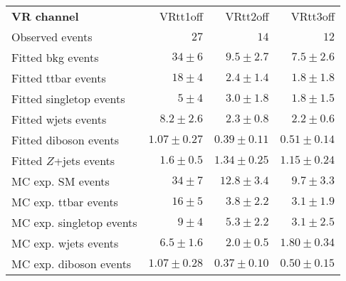 

\begin{table}
\begin{center}
\setlength{\tabcolsep}{0.0pc}
{\small
\begin{tabular*}{\textwidth}{@{\extracolsep{\fill}}lrrr}
\noalign{\smallskip}\hline\noalign{\smallskip}
{\textbf{ VR channel}}           & VRtt1off            & VRtt2off            & VRtt3off              \\[-0.05cm]
\noalign{\smallskip}\hline\noalign{\smallskip}
Observed events          & $27$              & $14$              & $12$                    \\
\noalign{\smallskip}\hline\noalign{\smallskip}
Fitted bkg events         & $34 \pm 6$          & $9.5 \pm 2.7$          & $7.5 \pm 2.6$              \\
\noalign{\smallskip}\hline\noalign{\smallskip}
        Fitted ttbar events         & $18 \pm 4$          & $2.4 \pm 1.4$          & $1.8 \pm 1.8$              \\
        Fitted singletop events         & $5 \pm 4$          & $3.0 \pm 1.8$          & $1.8 \pm 1.5$              \\
        Fitted wjets events         & $8.2 \pm 2.6$          & $2.3 \pm 0.8$          & $2.2 \pm 0.6$              \\
        Fitted diboson events         & $1.07 \pm 0.27$          & $0.39 \pm 0.11$          & $0.51 \pm 0.14$              \\
        Fitted $Z$+jets events         & $1.6 \pm 0.5$          & $1.34 \pm 0.25$          & $1.15 \pm 0.24$              \\
 \noalign{\smallskip}\hline\noalign{\smallskip}
MC exp. SM events              & $34 \pm 7$          & $12.8 \pm 3.4$          & $9.7 \pm 3.3$              \\
\noalign{\smallskip}\hline\noalign{\smallskip}
        MC exp. ttbar events         & $16 \pm 5$          & $3.8 \pm 2.2$          & $3.1 \pm 1.9$              \\
        MC exp. singletop events         & $9 \pm 4$          & $5.3 \pm 2.2$          & $3.1 \pm 2.5$              \\
        MC exp. wjets events         & $6.5 \pm 1.6$          & $2.0 \pm 0.5$          & $1.80 \pm 0.34$              \\
        MC exp. diboson events         & $1.07 \pm 0.28$          & $0.37 \pm 0.10$          & $0.50 \pm 0.15$              \\

\end{tabular*}}
\end{center}
\end{table}
